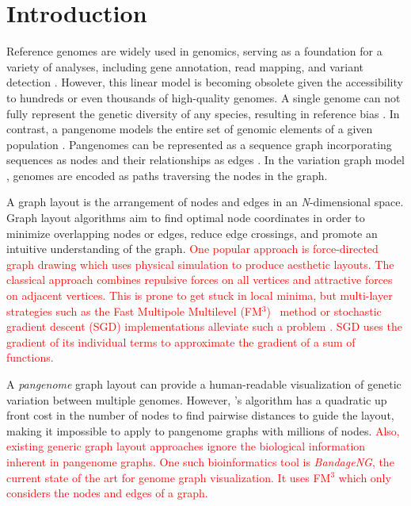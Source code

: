 \documentclass{bioinfo}
\theoremstyle{definition}
\newcommand{\red}[1]{{\textcolor{Red}{#1}}}
\begin{document}
	\section{Introduction}
	Reference genomes are widely used in genomics, serving as a foundation for a variety of analyses, including gene annotation, read mapping, and variant detection \citep{Singh2022}.
	However, this linear model is becoming obsolete given the accessibility to hundreds or even thousands of high-quality genomes.
	A single genome can not fully represent the genetic diversity of any species, resulting in reference bias \citep{Ballouz2019}.
	In contrast, a pangenome models the entire set of genomic elements of a given population \citep{Tettelin_2008,cpang2018,Eizenga_2020, Sherman_2020}.
	Pangenomes can be represented as a sequence graph incorporating sequences as nodes and their relationships as edges \citep{Hein1989}.
	In the variation graph model \citep{Garrison:2018}, genomes are encoded as paths traversing the nodes in the graph.
	
	A graph layout is the arrangement of nodes and edges in an \textit{N}-dimensional space.
	Graph layout algorithms aim to find optimal node coordinates in order to minimize overlapping nodes or edges, reduce edge crossings, and promote an intuitive understanding of the graph.
	\red{One popular approach is force-directed graph drawing \citep{cheong_force-directed_2022} which uses physical simulation to produce aesthetic layouts. The classical approach combines repulsive forces on all vertices and attractive forces on adjacent vertices.  %
	This is prone to get stuck in local minima, but multi-layer strategies such as the Fast Multipole Multilevel (FM$^{3}$)~\citep{Hachul2005} method or stochastic gradient descent (SGD) implementations alleviate such a problem \citep{Zheng2019}.
	SGD uses the gradient of its individual terms to approximate the gradient of a sum of functions.} 
	
	A \textit{pangenome} graph layout can provide a human-readable visualization of genetic variation between multiple genomes.
	However, \cite{Zheng2019}'s algorithm has a quadratic up front cost in the number of nodes to find pairwise distances to guide the layout, making it impossible to apply to pangenome graphs with millions of nodes. 
	\red{Also, existing generic graph layout approaches ignore the biological information inherent in pangenome graphs. One such bioinformatics tool is \textit{BandageNG}, the current state of the art for genome graph visualization. It uses FM$^{3}$ which only considers the nodes and edges of a graph.} 
	
\end{document}
